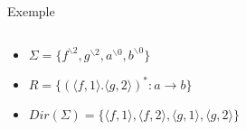 \begin{frame}{Exemple}
  \begin{columns}
    \begin{column}{0.5\textwidth}
      \begin{itemize}
      \item $\Sigma = \{f^{\backslash 2}, g^{\backslash 2}, a^{\backslash 0}, b^{\backslash 0}\}$
      \item $R=\{(\langle f,1 \rangle.\langle g,2 \rangle)^* : a\rightarrow b\}$
      \item $Dir(\Sigma)=\{\langle f,1 \rangle,\langle f,2 \rangle, \langle g,1 \rangle, \langle g,2 \rangle\}$
      \end{itemize}
    \end{column}
    \begin{column}{0.5\textwidth}
\end{column}
\end{columns}
\end{frame}
